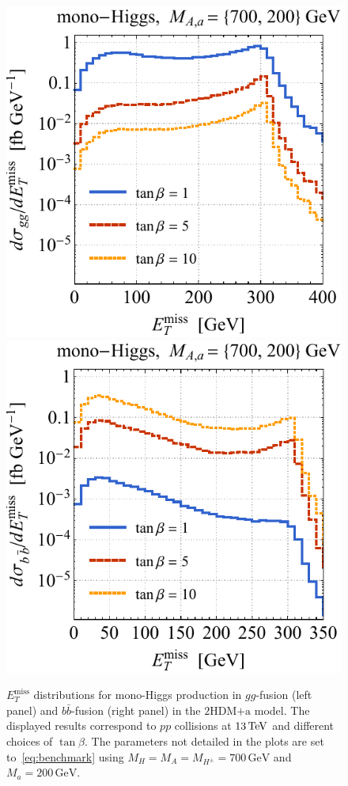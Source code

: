 \documentclass[review]{elsarticle}
\newcommand{\MET}{\ensuremath{E_T^\mathrm{miss}}\xspace}
\newcommand{\mA}{\ensuremath{M_{A}}\xspace}
\newcommand{\ma}{\ensuremath{M_{a}}\xspace}
\newcommand{\mH}{\ensuremath{M_{H}}\xspace}
\newcommand{\mHc}{\ensuremath{M_{H^{\pm}}}\xspace}
\newcommand{\hdma}{\ensuremath{\textrm{2HDM+a}}\xspace}
\begin{document}
\begin{figure}[t!]
\centering
\includegraphics[height=0.45\textwidth]{tblh.pdf} \qquad 
\includegraphics[height=0.45\textwidth]{tbrh.pdf}
\vspace{2mm}
\caption{\label{fig:tbvar1} 
$\MET$ distributions for mono-Higgs production in $gg$-fusion (left panel) and $b \bar b$-fusion (right panel) in the \hdma model. The displayed results correspond to $pp$ collisions at  $13 \, {\rm TeV}$ and different choices of $\tan \beta$. The parameters not detailed in the plots are set to~\eqref{eq:benchmark} using $\mH = \mA = \mHc = 700 \, {\mathrm{GeV}}$ and $\ma = 200 \, {\mathrm{GeV}}$.}
\end{figure}
\end{document}
